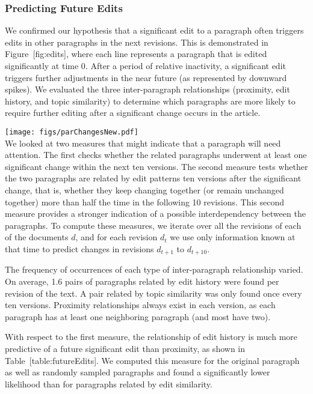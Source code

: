 \subsubsection{Predicting Future Edits}\label{predicting-future-edits-1}

We confirmed our hypothesis that a significant edit to a paragraph often
triggers edits in other paragraphs in the next revisions. This is
demonstrated in Figure~{[}fig:edits{]}, where each line represents a
paragraph that is edited significantly at time 0. After a period of
relative inactivity, a significant edit triggers further adjustments in
the near future (as represented by downward spikes). We evaluated the
three inter-paragraph relationships (proximity, edit history, and topic
similarity) to determine which paragraphs are more likely to require
further editing after a significant change occurs in the article.

\texttt{[image: figs/parChangesNew.pdf]}\\

We looked at two measures that might indicate that a paragraph will need
attention. The first checks whether the related paragraphs underwent at
least one significant change within the next ten versions. The second
measure tests whether the two paragraphs are related by edit patterns
ten versions after the significant change, that is, whether they keep
changing together (or remain unchanged together) more than half the time
in the following 10 revisions. This second measure provides a stronger
indication of a possible interdependency between the paragraphs. To
compute these measures, we iterate over all the revisions of each of the
documents \(d\), and for each revision \(d_t\) we use only information
known at that time to predict changes in revisions \(d_{t+1}\) to
\(d_{t+10}\).

The frequency of occurrences of each type of inter-paragraph
relationship varied. On average, 1.6 pairs of paragraphs related by edit
history were found per revision of the text. A pair related by topic
similarity was only found once every ten versions. Proximity
relationships always exist in each version, as each paragraph has at
least one neighboring paragraph (and most have two).

With respect to the first measure, the relationship of edit history is
much more predictive of a future significant edit than proximity, as
shown in Table~{[}table:futureEdits{]}. We computed this measure for the
original paragraph as well as randomly sampled paragraphs and found a
significantly lower likelihood than for paragraphs related by edit
similarity.

